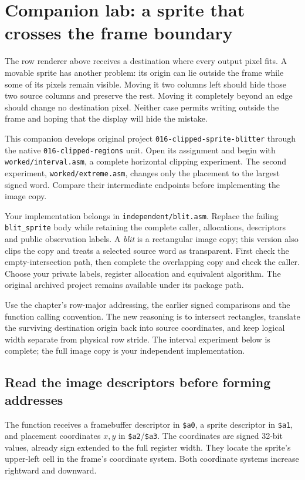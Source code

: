 \section{Companion lab: a sprite that crosses the frame boundary}
\label{revision-lab:clipped-sprite}

The row renderer above receives a destination where every output pixel fits.
A movable sprite has another problem: its origin can lie outside the frame while
some of its pixels remain visible. Moving it two columns left should hide those
two source columns and preserve the rest. Moving it completely beyond an edge
should change no destination pixel. Neither case permits writing outside the
frame and hoping that the display will hide the mistake.

This companion develops original project \texttt{016-clipped-sprite-blitter}
through the native \texttt{016-clipped-regions} unit. Open its assignment and
begin with \texttt{worked/interval.asm}, a complete horizontal clipping experiment.
The second experiment, \texttt{worked/extreme.asm}, changes only the placement to
the largest signed word. Compare their intermediate endpoints before implementing
the image copy.

Your implementation belongs in \texttt{independent/blit.asm}. Replace the failing
\texttt{blit\_sprite} body while retaining the complete caller, allocations,
descriptors and public observation labels. A \emph{blit} is a rectangular image
copy; this version also clips the copy and treats a selected source word as
transparent. First check the empty-intersection path, then complete the overlapping
copy and check the caller. Choose your private labels, register allocation and
equivalent algorithm. The original archived project remains available under its
package path.

Use the chapter's row-major addressing, the earlier signed comparisons and the
function calling convention. The new reasoning is to intersect rectangles,
translate the surviving destination origin back into source coordinates, and
keep logical width separate from physical row stride. The interval experiment
below is complete; the full image copy is your independent implementation.

\subsection*{Read the image descriptors before forming addresses}

The function receives a framebuffer descriptor in \texttt{\$a0}, a sprite
descriptor in \texttt{\$a1}, and placement coordinates $x,y$ in
\texttt{\$a2}/\texttt{\$a3}. The coordinates are signed 32-bit values, already
sign extended to the full register width. They locate the sprite's upper-left
cell in the frame's coordinate system. Both coordinate systems increase rightward
and downward.

